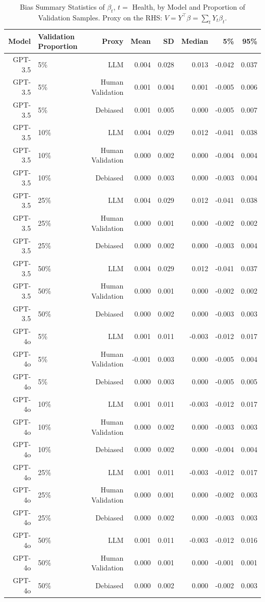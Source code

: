 \begin{table}

\caption{Bias Summary Statistics of $\beta_{t}$, $t=$ Health, by Model and Proportion of Validation Samples.
      Proxy on the RHS: $V = Y^\top \beta = \sum_{t} Y_t \beta_t$.}
\centering
\begin{tabular}[t]{rlrrrrrr}
\toprule
Model & Validation Proportion & Proxy & Mean & SD & Median & 5\% & 95\%\\
\midrule
GPT-3.5 & 5\% & LLM & 0.004 & 0.028 & 0.013 & -0.042 & 0.037\\
GPT-3.5 & 5\% & Human Validation & 0.001 & 0.004 & 0.001 & -0.005 & 0.006\\
GPT-3.5 & 5\% & Debiased & 0.001 & 0.005 & 0.000 & -0.005 & 0.007\\
GPT-3.5 & 10\% & LLM & 0.004 & 0.029 & 0.012 & -0.041 & 0.038\\
GPT-3.5 & 10\% & Human Validation & 0.000 & 0.002 & 0.000 & -0.004 & 0.004\\
GPT-3.5 & 10\% & Debiased & 0.000 & 0.003 & 0.000 & -0.003 & 0.004\\
GPT-3.5 & 25\% & LLM & 0.004 & 0.029 & 0.012 & -0.041 & 0.038\\
GPT-3.5 & 25\% & Human Validation & 0.000 & 0.001 & 0.000 & -0.002 & 0.002\\
GPT-3.5 & 25\% & Debiased & 0.000 & 0.002 & 0.000 & -0.003 & 0.004\\
GPT-3.5 & 50\% & LLM & 0.004 & 0.029 & 0.012 & -0.041 & 0.037\\
GPT-3.5 & 50\% & Human Validation & 0.000 & 0.001 & 0.000 & -0.002 & 0.002\\
GPT-3.5 & 50\% & Debiased & 0.000 & 0.002 & 0.000 & -0.003 & 0.003\\
GPT-4o & 5\% & LLM & 0.001 & 0.011 & -0.003 & -0.012 & 0.017\\
GPT-4o & 5\% & Human Validation & -0.001 & 0.003 & 0.000 & -0.005 & 0.004\\
GPT-4o & 5\% & Debiased & 0.000 & 0.003 & 0.000 & -0.005 & 0.005\\
GPT-4o & 10\% & LLM & 0.001 & 0.011 & -0.003 & -0.012 & 0.017\\
GPT-4o & 10\% & Human Validation & 0.000 & 0.002 & 0.000 & -0.003 & 0.003\\
GPT-4o & 10\% & Debiased & 0.000 & 0.002 & 0.000 & -0.004 & 0.004\\
GPT-4o & 25\% & LLM & 0.001 & 0.011 & -0.003 & -0.012 & 0.017\\
GPT-4o & 25\% & Human Validation & 0.000 & 0.001 & 0.000 & -0.002 & 0.003\\
GPT-4o & 25\% & Debiased & 0.000 & 0.002 & 0.000 & -0.003 & 0.003\\
GPT-4o & 50\% & LLM & 0.001 & 0.011 & -0.003 & -0.012 & 0.016\\
GPT-4o & 50\% & Human Validation & 0.000 & 0.001 & 0.000 & -0.001 & 0.001\\
GPT-4o & 50\% & Debiased & 0.000 & 0.002 & 0.000 & -0.002 & 0.003\\
\bottomrule
\end{tabular}
\end{table}
